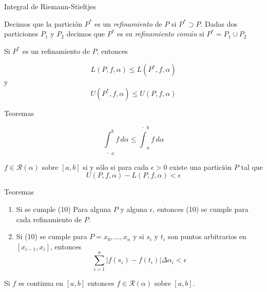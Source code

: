 \documentclass[11pt]{beamer}
\begin{document}
\begin{frame}{Integral de Riemann-Stieltjes}

\begin{definition}[5]
Decimos que la partición $P^*$ es un \textit{refinamiento} de $P$ si $P^* \supset P$. Dadas dos particiones $P_1$ y $P_2$ decimos que $P^*$ es su \textit{refinamiento común} si $P^* = P_1 \cup P_2$
\end{definition}

\begin{theorem}[1]
Si $P^*$ es un refinamiento de $P$, entonces

\begin{equation}
	L(P, f, \alpha) \leq L(P^*, f, \alpha)
\end{equation}
y
\begin{equation}
	U(P^*, f, \alpha) \leq U(P, f, \alpha)
\end{equation}
\end{theorem}

\end{frame}

\begin{frame}{Teoremas}

\begin{theorem}[2]
\[
	\underline{\int}_a^b f\,d\alpha \leq \overline{\int}_a^b f\,d\alpha
\]
\end{theorem}

\begin{theorem}[3]
$f \in \mathcal{R}(\alpha)$ sobre $[a, b]$ si y sólo si para cada $\epsilon > 0$ existe una partición $P$ tal que
\begin{equation}
	U(P, f, \alpha) - L(P, f, \alpha) < \epsilon
\end{equation}
\end{theorem}

\end{frame}

\begin{frame}{Teoremas}

\begin{theorem}[4]
	\begin{enumerate}
		\item Si se cumple (10) Para alguna $P$ y alguna $\epsilon$, entonces (10) se cumple para cada refinamiento de $P$.
		\item Si (10) se cumple para $P = {x_0, \dots, x_n}$ y si $s_i$ y $t_i$ son puntos arbitrarios en $[x_{i-1}, x_i]$, entonces
		\[
			\sum_{i=1}^n |f(s_i) - f(t_i)|\Delta\alpha_i < \epsilon
		\]
	\end{enumerate}
\end{theorem}

\begin{theorem}[5]
Si $f$ es continua en $[a, b]$ entonces $f \in \mathcal{R}(\alpha)$ sobre $[a, b]$.
\end{theorem}

\end{frame}
\end{document}
